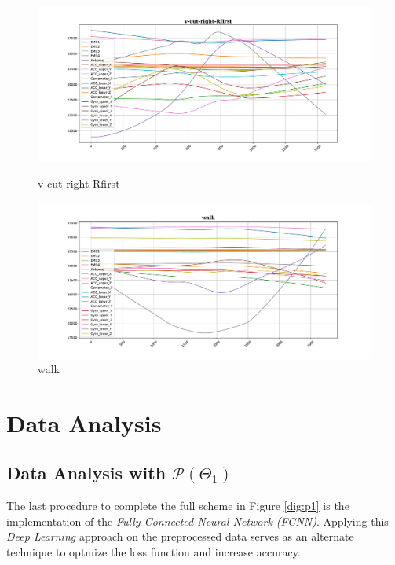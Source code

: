 \begin{figure}[!tbp]
	\begin{minipage}[b]{0.45\textwidth}
		\includegraphics[width=\textwidth]{images/v-cut-right-Rfirst_example.pdf}
		\caption{v-cut-right-Rfirst}
	\end{minipage}
	\begin{minipage}[b]{0.45\textwidth}
		\includegraphics[width=\textwidth]{images/walk_example.pdf}
		\caption{walk}
		\label{sm22}
	\end{minipage}
\end{figure}



\section{Data Analysis}


\subsection{Data Analysis with $\mathcal{P}(\Theta_{1})$}
The last procedure to complete the full scheme in Figure \ref{dig:p1} is the implementation of the
\emph{Fully-Connected Neural Network (FCNN)}. Applying this \emph{Deep Learning} approach on the preprocessed
data serves as an alternate technique to optmize the loss function and increase accuracy.

